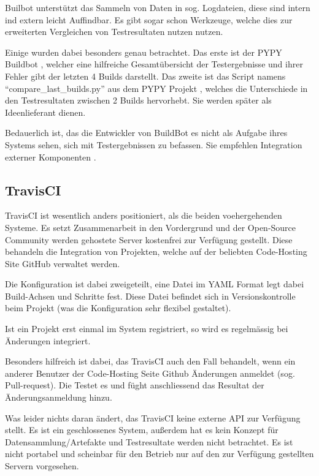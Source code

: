 Builbot unterst\"utzt das Sammeln von Daten in sog. Logdateien,
diese sind intern ind extern leicht Auffindbar.
Es gibt sogar schon Werkzeuge, welche dies zur erweiterten Vergleichen von Testresultaten nutzen nutzen.

Einige wurden dabei besonders genau betrachtet.
Das erste ist der PYPY Buildbot \cite{pypy:overview} , welcher eine hilfreiche Gesamtübersicht der Testergebnisse und ihrer Fehler gibt
der letzten 4 Builds darstellt.
Das zweite ist das Script namens ``compare\_last\_builds.py''
aus dem PYPY Projekt \cite{pypy:diffscript} ,
welches die Unterschiede in den Testresultaten zwischen 2 Builds hervorhebt.
Sie werden sp\"ater als Ideenlieferant dienen.

Bedauerlich ist, das die Entwickler von BuildBot es nicht als Aufgabe ihres Systems sehen,
sich mit Testergebnissen zu befassen.
Sie empfehlen Integration externer Komponenten \cite{buildbot:irc}.

\subsection{TravisCI}


TravisCI \cite{travisci:website} ist wesentlich anders positioniert, als die beiden voehergehenden Systeme.
Es setzt Zusammenarbeit in den Vordergrund und der Open-Source Community werden gehostete Server
kostenfrei zur Verf\"ugung gestellt.
Diese behandeln die Integration von Projekten,
welche auf der beliebten Code-Hosting Site GitHub verwaltet werden.

Die Konfiguration ist dabei zweigeteilt,
eine Datei im YAML Format \cite{yaml:website} legt dabei Build-Achsen und Schritte fest.
Diese Datei befindet sich in Versionskontrolle beim Projekt
(was die Konfiguration sehr flexibel gestaltet).

Ist ein Projekt erst einmal im System registriert,
so wird es regelm\"assig bei Änderungen integriert.

Besonders hilfreich ist dabei, das TravisCI auch den Fall behandelt,
wenn ein anderer Benutzer der Code-Hosting Seite Github \"Anderungen anmeldet
\cite{github:pullreq} (sog. Pull-request).
Die Testet es und f\"ught anschliessend das Resultat der \"Anderungsanmeldung hinzu.

Was leider nichts daran \"andert, das TravisCI keine externe API zur Verfügung stellt.
Es ist ein geschlossenes System, außerdem hat es kein Konzept f\"ur Datensammlung/Artefakte
und Testresultate werden nicht betrachtet.
Es ist nicht portabel und scheinbar f\"ur den Betrieb nur
auf den zur Verfügung gestellten Servern vorgesehen.


